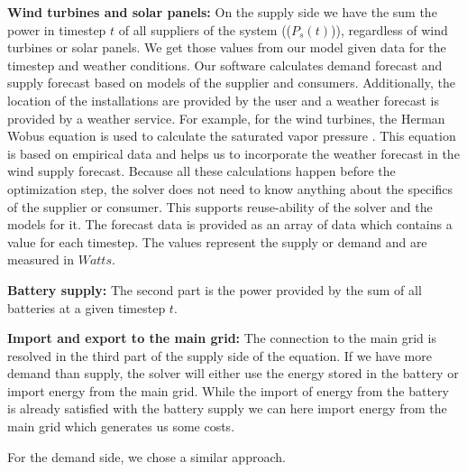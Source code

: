 \textbf{Wind turbines and solar panels:} On the supply side we have the sum the power in timestep $t$ of all suppliers of the system (($P_{s}(t)$)), regardless of wind turbines or solar panels.
We get those values from our model given data for the timestep and weather conditions. 
Our software calculates demand forecast and supply forecast based on models of the supplier and consumers. 
Additionally, the location of the installations are provided by the user and a weather forecast is provided by a weather service. 
For example, for the wind turbines, the Herman Wobus equation is used to calculate the saturated vapor pressure \cite{NOAA}. 
This equation is based on empirical data and helps us to incorporate the weather forecast in the wind supply forecast. 
Because all these calculations happen before the optimization step, the solver does not need to know anything about the specifics of the supplier or consumer. 
This supports reuse-ability of the solver and the models for it. 
The forecast data is provided as an array of data which contains a value for each timestep. 
The values represent the supply or demand and are measured in $Watts$.  %

\textbf{Battery supply:} The second part is the power provided by the sum of all batteries at a given timestep $t$. %

\textbf{Import and export to the main grid:} The connection to the main grid is resolved in the third part of the supply side of the equation.
If we have more demand than supply, the solver will either use the energy stored in the battery or import energy from the main grid.
While the import of energy from the battery is already satisfied with the battery supply we can here import energy from the main grid which generates us some costs.

For the demand side, we chose a similar approach.

